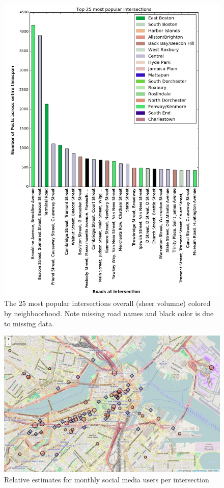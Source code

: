 \documentclass[twocolumn,10pt]{asme2ej}
\begin{document}
\begin{figure} 
\includegraphics[scale=0.3]{popularintersections.png}
\caption{The 25 most popular intersections overall (sheer volumne) colored by neighboorhood. Note missing road names and black color is due to missing data.}
\end{figure}
\begin{figure}
\includegraphics[scale=0.2]{estimate.jpg}
\caption{Relative estimates for monthly social media users per intersection}
\end{figure}
\end{document}
